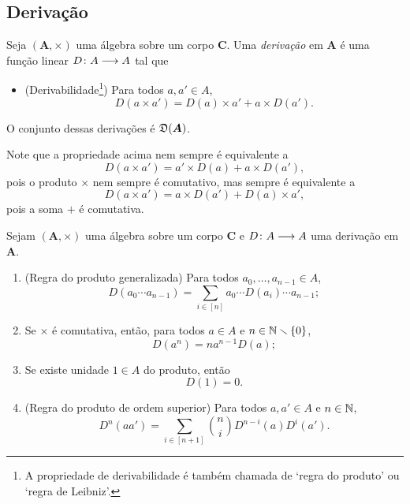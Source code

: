 	

\subsection{Derivação}

\begin{definition}
Seja $(\bm A,\times)$ uma álgebra sobre um corpo $\bm C$. Uma \emph{derivação} em $\bm A$ é uma função linear ${D}\colon {A} \longrightarrow {A}$ tal que
	\begin{itemize}
	\item (Derivabilidade\footnote{A propriedade de derivabilidade é também chamada de `regra do produto' ou `regra de Leibniz'.}) Para todos $a,a' \in A$,
		\begin{equation*}
		D(a \times a') = D(a) \times a' + a \times D(a').
		\end{equation*}
	\end{itemize}
O conjunto dessas derivações é $\mathfrak{D}(\bm A)$.
\end{definition}

Note que a propriedade acima nem sempre é equivalente a
	\begin{equation*}
	D(a \times a') = a' \times D(a) + a \times D(a'),
	\end{equation*}
pois o produto $\times$ nem sempre é comutativo, mas sempre é equivalente a
	\begin{equation*}
	D(a \times a') = a \times D(a') + D(a) \times a',
	\end{equation*}
pois a soma $+$ é comutativa.

\begin{proposition}
Sejam $(\bm A,\times)$ uma álgebra sobre um corpo $\bm C$ e ${D}\colon {A} \longrightarrow {A}$ uma derivação em $\bm A$.
	\begin{enumerate}
	\item (Regra do produto generalizada) Para todos $a_0,\ldots,a_{n-1} \in A$,
		\begin{equation*}
		D(a_0 \cdots a_{n-1}) = \sum_{i \in [n]} a_0 \cdots D(a_i) \cdots a_{n-1};
		\end{equation*}
	\item Se $\times$ é comutativa, então, para todos $a \in A$ e $n \in \mathbb{N} \smallsetminus \{0\}$,
		\begin{equation*}
		D(a^n) = na^{n-1}D(a);
		\end{equation*}
	\item Se existe unidade $1 \in A$ do produto, então
		\begin{equation*}
		D(1)=0.
		\end{equation*}
	\item (Regra do produto de ordem superior) Para todos $a,a' \in A$ e $n \in \mathbb{N}$,
		\begin{equation*}
		D^n(aa') = \sum_{i \in [n+1]} \binom{n}{i} D^{n-i}(a)D^i(a').
		\end{equation*}
	\end{enumerate}
\end{proposition}

